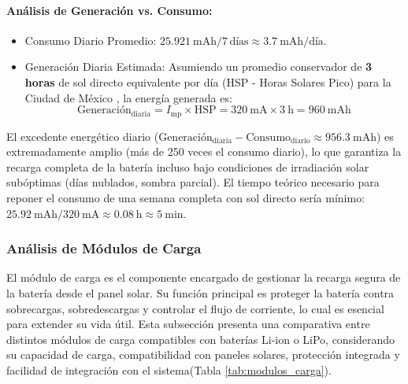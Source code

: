 \paragraph*{Análisis de Generación vs. Consumo:}
\begin{itemize}
    \item Consumo Diario Promedio: $\SI{25.921}{\milli\ampere\hour} / 7\,\text{días} \approx \SI{3.7}{\milli\ampere\hour / \text{día}}$.
    \item Generación Diaria Estimada: Asumiendo un promedio conservador de \textbf{3 horas} de sol directo equivalente por día (HSP - Horas Solares Pico) para la Ciudad de México \cite{solarGIS}, la energía generada es:
    \begin{equation} \label{eq:generacion_diaria}
    \text{Generación}_{\text{diaria}} = I_{\text{mp}} \times \text{HSP} = \SI{320}{\milli\ampere} \times \SI{3}{\hour} = \SI{960}{\milli\ampere\hour}
    \end{equation}
\end{itemize}
El excedente energético diario ($\text{Generación}_{\text{diaria}} - \text{Consumo}_{\text{diario}} \approx \SI{956.3}{\milli\ampere\hour}$) es extremadamente amplio (más de 250 veces el consumo diario), lo que garantiza la recarga completa de la batería incluso bajo condiciones de irradiación solar subóptimas (días nublados, sombra parcial). El tiempo teórico necesario para reponer el consumo de una semana completa con sol directo sería mínimo: $\SI{25.92}{\milli\ampere\hour} / \SI{320}{\milli\ampere} \approx \SI{0.08}{\hour} \approx \SI{5}{\minute}$.

\subsubsection{Análisis de Módulos de Carga}
\label{subsubsec:analisis_de_modulos_de_carga}

El módulo de carga es el componente encargado de gestionar la recarga segura de la batería desde el panel solar. Su función principal es proteger la batería contra sobrecargas, sobredescargas y controlar el flujo de corriente, lo cual es esencial para extender su vida útil. Esta subsección presenta una comparativa entre distintos módulos de carga compatibles con baterías Li-ion o LiPo, considerando su capacidad de carga, compatibilidad con paneles solares, protección integrada y facilidad de integración con el sistema(Tabla \ref{tab:modulos_carga}).

